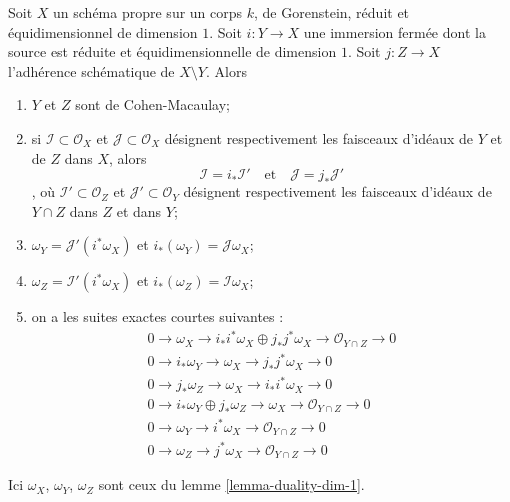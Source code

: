 \begin{lemma}
\label{lemma-closed-subscheme-reduced-gorenstein}
Soit $X$ un schéma propre sur un corps $k$, de Gorenstein, réduit et équidimensionnel de dimension $1$. Soit $i : Y \to X$ une immersion fermée dont la source est réduite et équidimensionnelle de dimension $1$. Soit $j : Z \to X$ l'adhérence schématique de $X \setminus Y$. Alors \begin{enumerate} \item $Y$ et $Z$ sont de Cohen-Macaulay; \item si $\mathcal{I} \subset \mathcal{O}_X$ et $\mathcal{J} \subset \mathcal{O}_X$ désignent respectivement les faisceaux d'idéaux de $Y$ et de $Z$ dans $X$, alors $$
\mathcal{I} = i_*\mathcal{I}'
\quad\text{et}\quad
\mathcal{J} = j_*\mathcal{J}'
$$, où $\mathcal{I}' \subset \mathcal{O}_Z$ et $\mathcal{J}' \subset \mathcal{O}_Y$ désignent respectivement les faisceaux d'idéaux de $Y \cap Z$ dans $Z$ et dans $Y$; \item $\omega_Y = \mathcal{J}'(i^*\omega_X)$ et $i_*(\omega_Y) = \mathcal{J}\omega_X$; \item $\omega_Z = \mathcal{I}'(i^*\omega_X)$ et $i_*(\omega_Z) = \mathcal{I}\omega_X$; \item on a les suites exactes courtes suivantes : \begin{align*}
0 \to \omega_X \to i_*i^*\omega_X \oplus j_*j^*\omega_X \to
\mathcal{O}_{Y \cap Z} \to 0 \\
0 \to i_*\omega_Y \to \omega_X \to j_*j^*\omega_X \to 0 \\
0 \to j_*\omega_Z \to \omega_X \to i_*i^*\omega_X \to 0 \\
0 \to i_*\omega_Y \oplus j_*\omega_Z \to \omega_X \to
\mathcal{O}_{Y \cap Z} \to 0 \\
0 \to \omega_Y \to i^*\omega_X \to \mathcal{O}_{Y \cap Z} \to 0 \\
0 \to \omega_Z \to j^*\omega_X \to \mathcal{O}_{Y \cap Z} \to 0
\end{align*} \end{enumerate} Ici $\omega_X$, $\omega_Y$, $\omega_Z$ sont ceux du lemme \ref{lemma-duality-dim-1}.
\end{lemma}

